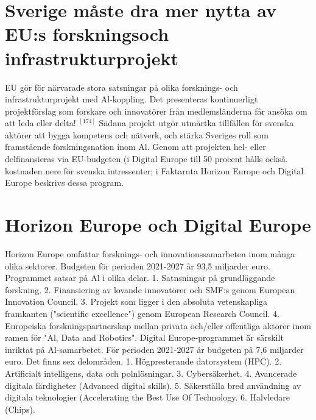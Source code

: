 {{{{{{{{{{{{{{{{\section*{Sverige måste dra mer nytta av EU:s forskningsoch infrastrukturprojekt}
EU gör för närvarade stora satsningar på olika forsknings- och infrastrukturprojekt med Al-koppling. Det presenteras kontinuerligt projektförslag som forskare och innovatörer från medlemsländerna får ansöka om att leda eller delta! \({ }^{[174]}\) Sädana projekt utgör utmärtka tillfällen för svenska aktörer att bygga kompetens och nätverk, och stärka Sveriges roll som framstående forskningsnation inom Al. Genom att projekten hel- eller delfinansieras via EU-budgeten (i Digital Europe till 50 procent hålls också. kostnaden nere för svenska intressenter; i Faktaruta Horizon Europe och Digital Europe beskrivs dessa program.
\section*{Horizon Europe och Digital Europe}
Horizon Europe omfattar forsknings- och innovationssamarbeten inom många olika sektorer. Budgeten för perioden 2021-2027 år 93,5 miljarder euro. Programmet satsar på Al i olika delar.
1. Satnsningar på grundläggande forskning.
2. Finansiering av lovande innovatörer och SMF:s genom European Innovation Council.
3. Projekt som ligger i den absoluta vetenskapliga framkanten ("scientific excellence") genom European Research Council.
4. Europeiska forskningspartnerskap mellan privata och/eller offentliga aktörer inom ramen för "Al, Data and Robotics".
Digital Europe-programmet är särskilt inriktat på Al-samarbetet. För perioden 2021-2027 år budgeten på 7,6 miljarder euro. Det finns sex delområden.
1. Högpresterande datorsystem (HPC).
2. Artificialt intelligens, data och polnlösningar.
3. Cybersäkerhet.
4. Avancerade digitala färdigheter (Advanced digital skills).
5. Säkerställa bred användning av digitala teknologier (Accelerating the Best Use Of Technology.
6. Halvledare (Chips).

}}}}}}}}}}}}}}}}
